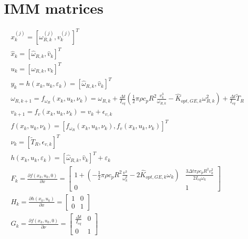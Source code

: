 \newpage
\section{IMM matrices}\label{sec:e_symbolic_IMM}
\begin{gather}
  x^{(j)}_{k} = \left[\omega_{R,k}^{(j)}, v_{k}^{(j)}\right]^T \\
  \hat{x}_{k} = \left[\hat{\omega}_{R,k}, \hat{v}_{k}\right]^T \\
  u_{k} = \left[\omega_{R,k}, v_{k}\right]^T \\
  y_k = h(x_k, u_k, \varepsilon_k) = \left[\hat{\omega}_{R,k}, \hat{v}_{k}\right]^T \\
  \omega_{R,k+1} = f_{\omega_{R}}(x_k, u_k, \nu_k) = \omega_{R,k} + \frac{\Delta t}{I_{eq}} \left(\frac{1}{2}\pi\rho c_{p} R^2 \frac{v_k^3}{\omega_{R,k}} - \hat{K}_{opt,GE,k}\omega_{R,k}^2\right) + \frac{\Delta t}{I_{eq}}\tilde{T}_R\\
  v_{k+1} = f_{v}(x_k, u_k, \nu_k) = v_k + \epsilon_{v,k} \\
  f(x_k, u_k, \nu_k) = \left[f_{\omega_{R}}(x_k, u_k, \nu_k), f_{v}(x_k, u_k, \nu_k)\right]^T\\
  \nu_k = \left[\tilde{T}_R, \epsilon_{v,k}\right]^T\\
  h(x_k, u_k, \varepsilon_k) = \left[\hat{\omega}_{R,k}, \hat{v}_{k}\right]^T + \varepsilon_k\\
  F_k = \frac{\partial f(x_k, u_k, 0)}{\partial x} = 
    \begin{bmatrix}
      1+\left(-\frac{1}{2}\pi\rho c_{p} R^2 \frac{v^3}{\omega_k^2}-2 \hat{K}_{opt,GE,k} \omega_k\right) & \frac{3\Delta t \pi \rho c_p R^2 v_k^2}{2 I_{eq} \omega_k}\\
      0 & 1 
    \end{bmatrix}\\
  H_k = \frac{\partial h(x_k, u_k)}{\partial x}=
    \begin{bmatrix}
      1 & 0\\
      0 & 1 
    \end{bmatrix}\\
 G_k = \frac{\partial f(x_k, u_k, 0)}{\partial \nu} = 
  \begin{bmatrix}
    \frac{\Delta t}{I_{eq}} & 0\\
    0 & 1 
  \end{bmatrix}
\end{gather}
